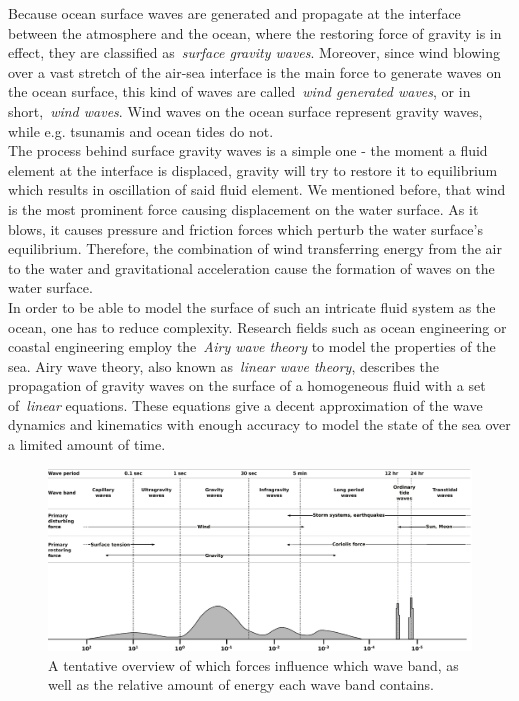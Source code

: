 Because ocean surface waves are generated and propagate at the interface between the atmosphere
and the ocean, where the restoring force of gravity is in effect, they are classified as~\emph{surface gravity waves}.
Moreover, since wind blowing over a vast stretch of the air-sea interface is the main force to generate waves on
the ocean surface, this kind of waves are called~\emph{wind generated waves}, or in short,~\emph{wind waves}.
Wind waves on the ocean surface represent gravity waves, while e.g. tsunamis and ocean tides do not.\\

The process behind surface gravity waves is a simple one - the moment a fluid element at the interface is displaced, gravity
will try to restore it to equilibrium which results in oscillation of said fluid element. We mentioned before,
that wind is the most prominent force causing displacement on the water surface. As it blows, it causes pressure and friction
forces which perturb the water surface's equilibrium. Therefore, the combination of wind transferring energy from the air
to the water and gravitational acceleration cause the formation of waves on the water surface.\\

In order to be able to model the surface of such an intricate fluid system as the ocean, one has to reduce complexity.
Research fields such as ocean engineering or coastal engineering employ the~\emph{Airy wave theory}\cite{book:airy1845tides}
to model the properties of the sea. Airy wave theory, also known as~\emph{linear wave theory}, describes the propagation of
gravity waves on the surface of a homogeneous fluid with a set of~\emph{linear} equations. These equations give
a decent approximation of the wave dynamics and kinematics with enough accuracy to model the state of the sea over a
limited amount of time.

\begin{figure}[tb]
	\centering
	\includegraphics[width=\textwidth]{figures/SurfaceWavesEnergy}
	\caption{A tentative overview of which forces influence which wave band, as well as the relative amount of energy
each wave band contains.}
	\label{fig:surface_waves_energy}
\end{figure}

